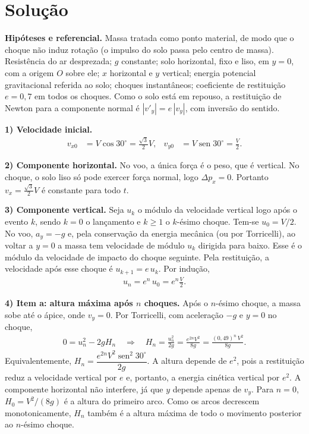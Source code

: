 \documentclass{article}%
\begin{document}
\section*{Solução}

\textbf{Hipóteses e referencial.} Massa tratada como ponto material, de modo que o choque não induz rotação (o impulso do solo passa pelo centro de massa). Resistência do ar desprezada; $g$ constante; solo horizontal, fixo e liso, em $y=0$, com a origem $O$ sobre ele; $x$ horizontal e $y$ vertical; energia potencial gravitacional referida ao solo; choques instantâneos; coeficiente de restituição $e=0{,}7$ em todos os choques. Como o solo está em repouso, a restituição de Newton para a componente normal é $|v'_y| = e\,|v_y|$, com inversão do sentido.

\textbf{1) Velocidade inicial.}
\begin{align*}
v_{x0} &= V\cos 30^\circ = \frac{\sqrt{3}}{2}V, & v_{y0} &= V\operatorname{sen}30^\circ = \frac{V}{2}.
\end{align*}

\textbf{2) Componente horizontal.} No voo, a única força é o peso, que é vertical. No choque, o solo liso só pode exercer força normal, logo $\Delta p_x = 0$. Portanto $v_x = \frac{\sqrt{3}}{2}V$ é constante para todo $t$.

\textbf{3) Componente vertical.} Seja $u_k$ o módulo da velocidade vertical logo após o evento $k$, sendo $k=0$ o lançamento e $k\ge 1$ o $k$-ésimo choque. Tem-se $u_0 = V/2$. No voo, $a_y=-g$ e, pela conservação da energia mecânica (ou por Torricelli), ao voltar a $y=0$ a massa tem velocidade de módulo $u_k$ dirigida para baixo. Esse é o módulo da velocidade de impacto do choque seguinte. Pela restituição, a velocidade após esse choque é $u_{k+1} = e\,u_k$. Por indução,
\begin{align*}
u_n = e^{n}\,u_0 = e^{n}\frac{V}{2}.
\end{align*}

\textbf{4) Item a: altura máxima após $n$ choques.} Após o $n$-ésimo choque, a massa sobe até o ápice, onde $v_y=0$. Por Torricelli, com aceleração $-g$ e $y=0$ no choque,
\begin{align*}
0 = u_n^2 - 2gH_n \quad\Rightarrow\quad H_n = \frac{u_n^2}{2g} = \frac{e^{2n}V^2}{8g} = \frac{(0{,}49)^{n}\,V^2}{8g}.
\end{align*}
Equivalentemente, $H_n = \dfrac{e^{2n}V^2\operatorname{sen}^2 30^\circ}{2g}$. A altura depende de $e^2$, pois a restituição reduz a velocidade vertical por $e$ e, portanto, a energia cinética vertical por $e^2$. A componente horizontal não interfere, já que $y$ depende apenas de $v_y$. Para $n=0$, $H_0 = V^2/(8g)$ é a altura do primeiro arco. Como os arcos decrescem monotonicamente, $H_n$ também é a altura máxima de todo o movimento posterior ao $n$-ésimo choque.
\end{document}
